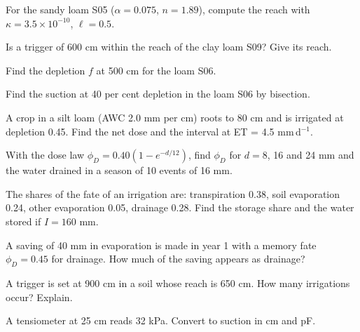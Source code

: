 \begin{exlist}
\item For the sandy loam S05 ($\alpha=0.075$, $n=1.89$), compute the reach with $\kappa=3.5\times10^{-10}$, $\ell=0.5$.\exans{1615 cm}
\item Is a trigger of 600 cm within the reach of the clay loam S09? Give its reach.
\item Find the depletion $f$ at 500 cm for the loam S06.
\item Find the suction at 40 per cent depletion in the loam S06 by bisection.\exans{246 cm}
\item A crop in a silt loam (AWC 2.0 mm per cm) roots to 80 cm and is irrigated at depletion 0.45. Find the net dose and the interval at ET = 4.5 mm\,d$^{-1}$.
\item With the dose law $\phi_D=0.40(1-e^{-d/12})$, find $\phi_D$ for $d=8$, 16 and 24 mm and the water drained in a season of 10 events of 16 mm.
\item The shares of the fate of an irrigation are: transpiration 0.38, soil evaporation 0.24, other evaporation 0.05, drainage 0.28. Find the storage share and the water stored if $I=160$ mm.
\item A saving of 40 mm in evaporation is made in year 1 with a memory fate $\phi_D=0.45$ for drainage. How much of the saving appears as drainage?\exans{18 mm}
\item A trigger is set at 900 cm in a soil whose reach is 650 cm. How many irrigations occur? Explain.
\item A tensiometer at 25 cm reads 32 kPa. Convert to suction in cm and pF.
\end{exlist}
